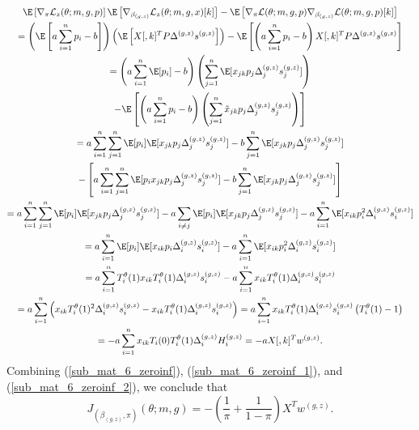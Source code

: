 \documentclass[11pt]{article}
\begin{document}
\begin{appendices}
\begin{refsection}
\begin{multline}
\E \left[ \nabla_\pi \mathcal{L}_z(\theta; m, g, p) \right] \E\left[\nabla_{\beta_{(g,z)}} \mathcal{L}_z(\theta; m, g, x)[k] \right] - \E \left[\nabla_{\pi}\mathcal{L}(\theta; m,g,p) \nabla_{\beta_{(g,z)}} \mathcal{L} (\theta; m,g,p)[k] \right] \\= \left(\E \left[ a \sum_{i=1}^n p_i - b \right] \right)\left( \E \left[{X}[,k]^T P \Delta^{(g,z)} s^{(g,z)} \right]\right) - \E \left[ \left( a \sum_{i=1}^n p_i - b \right) {X}[,k]^T P \Delta^{(g,z)} s^{(g,z)}\right] \\ = \left( a \sum_{i=1}^n \E[p_i] - b \right) \left( \sum_{j=1}^n \E [x_{jk} p_j \Delta^{(g,z)}_j s^{(g,z)}_j] \right) \\ - \E \left[ \left( a \sum_{i=1}^n p_i - b \right) \left( \sum_{j=1}^n \tilde{x}_{jk} p_j \Delta^{(g,z)}_j s^{(g,z)}_j \right) \right] \\= a \sum_{i=1}^n \sum_{j=1}^n \E [p_i] \E[x_{jk} p_j \Delta^{(g,z)}_j s^{(g,z)}_j] - b \sum_{j=1}^n \E[x_{jk} p_j \Delta^{(g,z)}_j s^{(g,z)}_j] \\ - \left[a \sum_{i=1}^n \sum_{j=1}^n \E [ p_i x_{jk} p_j \Delta^{(g,z)}_j s^{(g,z)}_j] - b \sum_{j=1}^n \E[x_{jk} p_j \Delta^{(g,z)}_j s^{(g,z)}_j] \right] \\ = a \sum_{i=1}^n \sum_{j=1}^n \E[p_i] \E[{x}_{jk} p_j \Delta^{(g,z)}_j s^{(g,z)}_j] - a \sum_{i \neq j} \E[p_i] \E[x_{jk} p_j \Delta^{(g,z)}_j s^{(g,z)}_j] - a \sum_{i=1}^n \E[ x_{ik} p_i^2 \Delta^{(g,z)}_i s^{(g,z)}_i] \\ = a \sum_{i=1}^n \E[p_i] \E[x_{ik} p_i \Delta^{(g,z)}_i s^{(g,z)}_i] - a \sum_{i=1}^n \E[x_{ik} p_i^2 \Delta^{(g,z)}_i s^{(g,z)}_i] \\ = a \sum_{i=1}^n T^\theta_i(1) x_{ik} T^\theta_i(1) \Delta^{(g,z)}_i s^{(g,z)}_i - a \sum_{i=1}^n x_{ik} T^\theta_i(1) \Delta^{(g,z)}_i s^{(g,z)}_i \\ = a \sum_{i=1}^n \left( {x}_{ik} T^\theta_i(1)^2 \Delta^{(g,z)}_i s^{(g,z)}_i - x_{ik} T^\theta_i(1) \Delta^{(g,z)}_i s^{(g,z)}_i \right) = a \sum_{i=1}^n {x}_{ik}T^\theta_i(1)\Delta^{(g,z)}_i s^{(g,z)}_i \left( T^\theta_i(1) - 1\right) \\ = -a\sum_{i=1}^n x_{ik} T_i(0) T^\theta_i(1)\Delta^{(g,z)}_i H^{(g,z)}_i = -a X[,k]^T w^{(g,z)}.
\end{multline}
Combining (\ref{sub_mat_6_zeroinf}), (\ref{sub_mat_6_zeroinf_1}), and (\ref{sub_mat_6_zeroinf_2}), we conclude that
\begin{equation}\label{sub_mat_6_zeroinf_formula} J_{(\beta_{(g,z)},\pi)}(\theta; m, g) = -\left( \frac{1}{\pi} + \frac{1}{1-\pi} \right)X^T w^{(g,z)}.\end{equation}


\end{refsection}
\end{appendices}
\end{document}
